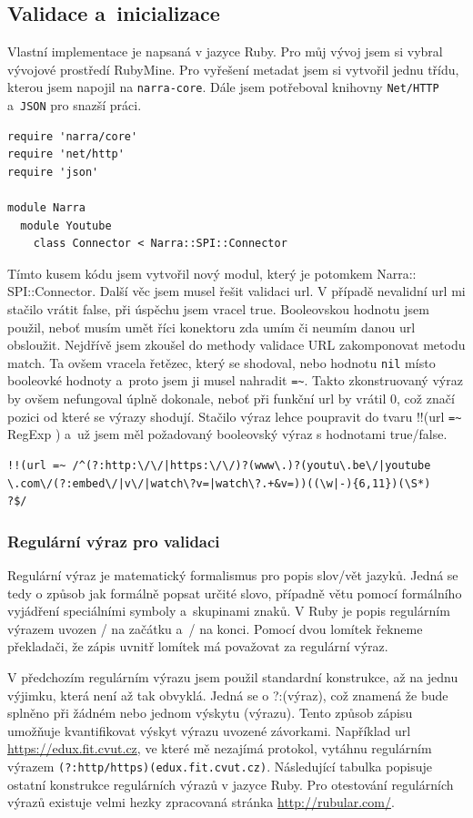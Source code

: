 \subsection{Validace a~inicializace}
\par Vlastní implementace je napsaná v jazyce Ruby. Pro můj vývoj jsem si vybral vývojové prostředí RubyMine. Pro vyřešení metadat jsem si vytvořil jednu třídu, kterou jsem napojil na \texttt{narra-core}. Dále jsem potřeboval knihovny \texttt{Net/HTTP} a~\texttt{JSON} pro snazší práci.
\begin{verbatim}
require 'narra/core'
require 'net/http'
require 'json'

module Narra
  module Youtube
    class Connector < Narra::SPI::Connector
\end{verbatim}
\par Tímto kusem kódu jsem vytvořil nový modul, který je potomkem Narra::\\SPI::Connector. Další věc jsem musel řešit validaci url. V případě nevalidní url mi stačilo vrátit false, při úspěchu jsem vracel true. Booleovskou hodnotu jsem použil, neboť musím umět říci konektoru zda umím či neumím danou url obsloužit. Nejdřívě jsem zkoušel do methody validace URL zakomponovat metodu match. Ta ovšem vracela řetězec, který se shodoval, nebo hodnotu \texttt{nil} místo booleovké hodnoty a~proto jsem ji musel nahradit \verb|=~|. Takto zkonstruovaný výraz by ovšem nefungoval úplně dokonale, neboť při funkční url by vrátil 0, což značí pozici od které se výrazy shodují. Stačilo výraz lehce poupravit do tvaru !!(url \verb|=~| RegExp ) a~už jsem měl požadovaný booleovský výraz s hodnotami true/false.
\begin{verbatim}
!!(url =~ /^(?:http:\/\/|https:\/\/)?(www\.)?(youtu\.be\/|youtube
\.com\/(?:embed\/|v\/|watch\?v=|watch\?.+&v=))((\w|-){6,11})(\S*)
?$/
\end{verbatim}
\subsubsection{Regulární výraz pro validaci}
\par Regulární výraz\cite{regexp} je matematický formalismus pro popis slov/vět jazyků. Jedná se tedy o způsob jak formálně popsat určité slovo, případně větu pomocí formálního vyjádření speciálními symboly a~skupinami znaků. V Ruby\cite{ruby} je popis regulárním výrazem uvozen / na začátku a~/ na konci. Pomocí dvou lomítek řekneme překladači, že zápis uvnitř lomítek má považovat za regulární výraz.
\par V předchozím regulárním výrazu jsem použil standardní konstrukce, až na jednu výjimku, která není až tak obvyklá. Jedná se o ?:(výraz), což znamená že bude splněno při žádném nebo jednom výskytu (výrazu). Tento způsob zápisu umožňuje kvantifikovat výskyt výrazu uvozené závorkami. Například url \url{https://edux.fit.cvut.cz}, ve které mě nezajímá protokol, vytáhnu regulárním výrazem \texttt{(?:http/https)(edux.fit.cvut.cz)}. Následující tabulka popisuje ostatní konstrukce regulárních výrazů v jazyce Ruby. Pro otestování regulárních výrazů existuje velmi hezky zpracovaná stránka \url{http://rubular.com/}\cite{michaellovitt}.

